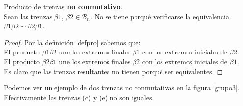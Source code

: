 \begin{pro} Producto de trenzas \textbf{no conmutativo}.\label{prodnocon}\\
	Sean las trenzas $\beta1$, $\beta2 \in \mathscr{B}_{n}$. No se tiene porqué verificarse la equivalencia $\beta1 \beta2 \sim \beta2 \beta1$.

	\begin{proof}	
		
		Por la definición \ref{defpro} sabemos que:\\
		El producto $\beta1 \beta2$ une los extremos finales $ \beta1 $ con los extremos iniciales de $\beta2 $. \\
		El producto $\beta2 \beta1$ une los extremos finales $ \beta2 $ con los extremos iniciales de $\beta1 $. \\
		
	    Es claro que las trenzas resultantes no tienen porqué ser equivalentes.
	\end{proof}
\end{pro}
Podemos ver un ejemplo de dos trenzas no conmutativas en la figura \ref{grupo3}. Efectivamente las trenzas (c) y (e) no son iguales.\\
